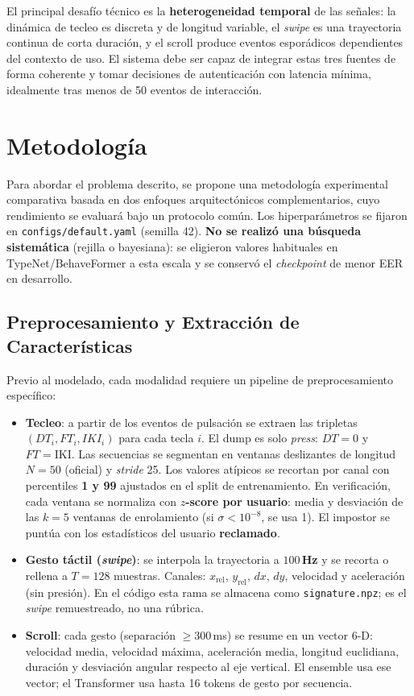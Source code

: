 El principal desafío técnico es la \textbf{heterogeneidad temporal} de las señales: la dinámica de tecleo 
es discreta y de longitud variable, el \textit{swipe} es una trayectoria continua de corta duración, y el scroll produce 
eventos esporádicos dependientes del contexto de uso. El sistema debe ser capaz de integrar estas tres fuentes 
de forma coherente y tomar decisiones de autenticación con latencia mínima, idealmente tras menos de 50 eventos
de interacción.

\section{Metodología}\label{sec:metodologia}
Para abordar el problema descrito, se propone una metodología experimental comparativa basada en dos 
enfoques arquitectónicos complementarios, cuyo rendimiento se evaluará bajo un protocolo común.
Los hiperparámetros se fijaron en \texttt{configs/default.yaml} (semilla 42). \textbf{No se realizó una búsqueda
sistemática} (rejilla o bayesiana): se eligieron valores habituales en TypeNet/BehaveFormer a esta escala y se
conservó el \textit{checkpoint} de menor EER en desarrollo.

\subsection{Preprocesamiento y Extracción de Características}
Previo al modelado, cada modalidad requiere un pipeline de preprocesamiento específico:

\begin{itemize}
    \item \textbf{Tecleo}: a partir de los eventos de pulsación se extraen las tripletas $(DT_i, FT_i, IKI_i)$ para cada tecla 
    $i$. El dump es solo \textit{press}: $DT=0$ y $FT=\mathrm{IKI}$. Las secuencias se segmentan en ventanas deslizantes de 
    longitud $N=50$ (oficial) y \textit{stride} 25. Los valores atípicos se recortan por canal con percentiles 
    \textbf{1 y 99} ajustados en el split de entrenamiento. En verificación, cada ventana se normaliza con 
    \textbf{$z$-score por usuario}: media y desviación de las $k=5$ ventanas de enrolamiento (si $\sigma<10^{-8}$, se usa 1).
    El impostor se puntúa con los estadísticos del usuario \textbf{reclamado}.
    \item \textbf{Gesto táctil (\textit{swipe})}: se interpola la trayectoria a \textbf{$100$\,Hz} y se recorta o rellena a 
    $T=128$ muestras. Canales: $x_{\mathrm{rel}}$, $y_{\mathrm{rel}}$, $dx$, $dy$, velocidad y aceleración (sin presión).
    En el código esta rama se almacena como \texttt{signature.npz}; es el \textit{swipe} remuestreado, no una rúbrica.
    \item \textbf{Scroll}: cada gesto (separación $\geq 300$\,ms) se resume en un vector 6-D: velocidad media, velocidad máxima,
    aceleración media, longitud euclidiana, duración y desviación angular respecto al eje vertical. El ensemble usa ese
    vector; el Transformer usa hasta 16 tokens de gesto por secuencia.
\end{itemize}


